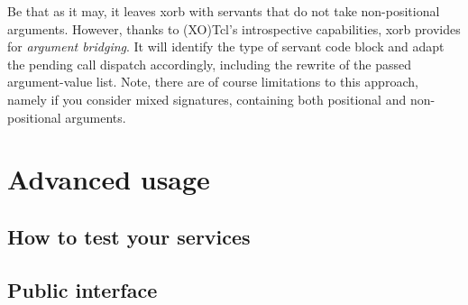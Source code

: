 Be that as it may, it leaves xorb with servants that do not take non-positional arguments. However, thanks to (XO)Tcl's introspective capabilities, xorb provides for \emph{argument bridging}. It will identify the type of servant code block and adapt the pending call dispatch accordingly, including the rewrite of the passed argument-value list. Note, there are of course limitations to this approach, namely if you consider mixed signatures, containing both positional and non-positional arguments.


  \section{Advanced usage}\label{sec:advanced}
  \subsection{How to test your services}
    \subsection{Public interface}\label{sec:interface}
